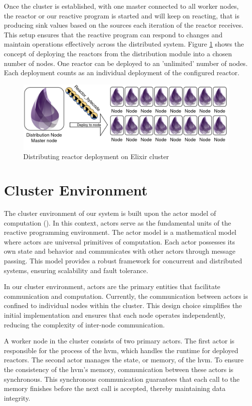 \documentclass[a4paper]{book}
\begin{document}
Once the cluster is established, with one master connected to all worker nodes, the reactor or our reactive program is started and will keep on reacting, that is producing sink values based on the sources each iteration of the reactor receives. This setup ensures that the reactive program can respond to changes and maintain operations effectively across the distributed system. Figure \ref{fig:rdi} shows the concept of deploying the reactors from the distribution module into a chosen number of nodes. One reactor can be deployed to an 'unlimited' number of nodes. Each deployment counts as an individual deployment of the configured reactor. 

\begin{figure}[h]
	\includegraphics[width=\textwidth]{distribution300.drawio}
	\caption{Distributing reactor deployment on Elixir cluster}
	\label{fig:rdi}
\end{figure}  

\section{Cluster Environment}
The cluster environment of our system is built upon the actor model of computation (\cite{hewitt:hal-01163534}). In this context, actors serve as the fundamental units of the reactive programming environment. The actor model is a mathematical model where actors are universal primitives of computation. Each actor possesses its own state and behavior and communicates with other actors through message passing. This model provides a robust framework for concurrent and distributed systems, ensuring scalability and fault tolerance.

In our cluster environment, actors are the primary entities that facilitate communication and computation. Currently, the communication between actors is confined to individual nodes within the cluster. This design choice simplifies the initial implementation and ensures that each node operates independently, reducing the complexity of inter-node communication.

A worker node in the cluster consists of two primary actors. The first actor is responsible for the process of the hvm, which handles the runtime for deployed reactors. The second actor manages the state, or memory, of the hvm. To ensure the consistency of the hvm's memory, communication between these actors is synchronous. This synchronous communication guarantees that each call to the memory finishes before the next call is accepted, thereby maintaining data integrity.
\end{document}
